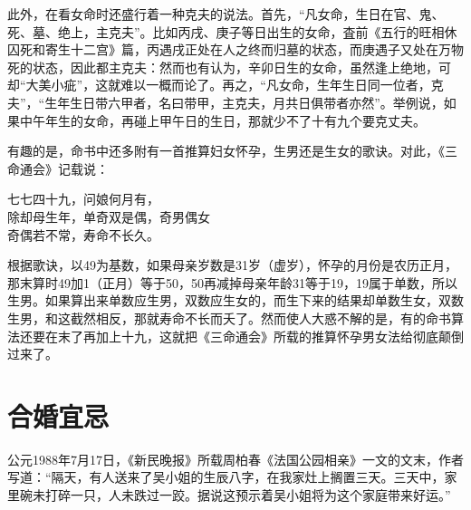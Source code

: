 \documentclass[a5paper,oneside,12pt]{ctexbook}
\newenvironment{tightcenter}{%
  \setlength\topsep{0pt}
  \setlength\parskip{0pt}
  \begin{center}\kaishu 
}{%
  \end{center}
}
\begin{document}
此外，在看女命时还盛行着一种克夫的说法。首先，“凡女命，生日在官、鬼、死、墓、绝上，主克夫”。比如丙戌、庚子等日出生的女命，査前《五行的旺相休囚死和寄生十二宫》篇，丙遇戌正处在人之终而归墓的状态，而庚遇子又处在万物死的状态，因此都主克夫：然而也有认为，辛卯日生的女命，虽然逢上绝地，可却“大美小疵”，这就难以一概而论了。再之，“凡女命，生年生日同一位者，克夫”，“生年生日带六甲者，名曰带甲，主克夫，月共日俱带者亦然”。举例说，如果中午年生的女命，再碰上甲午日的生日，那就少不了十有九个要克丈夫。

有趣的是，命书中还多附有一首推算妇女怀孕，生男还是生女的歌诀。对此，《三命通会》记载说：
\begin{tightcenter}
    七七四十九，问娘何月有，\\
    除却母生年，单奇双是偶，{\scriptsize 奇男偶女}\\
    奇偶若不常，寿命不长久。
\end{tightcenter}

根据歌诀，以49为基数，如果母亲岁数是31岁（虚岁），怀孕的月份是农历正月，那末算时49加1（正月）等于50，50再减掉母亲年龄31等于19，19属于单数，所以生男。如果算出来单数应生男，双数应生女的，而生下来的结果却单数生女，双数生男，和这截然相反，那就寿命不长而夭了。然而使人大惑不解的是，有的命书算法还要在末了再加上十九，这就把《三命通会》所载的推算怀孕男女法给彻底颠倒过来了。	

\section{合婚宜忌}
公元1988年7月17日，《新民晚报》所载周柏春《法国公园相亲》一文的文末，作者写道：“隔天，有人送来了吴小姐的生辰八字，在我家灶上搁置三天。三天中，家里碗未打碎一只，人未跌过一跤。据说这预示着吴小姐将为这个家庭带来好运。”
\end{document}
